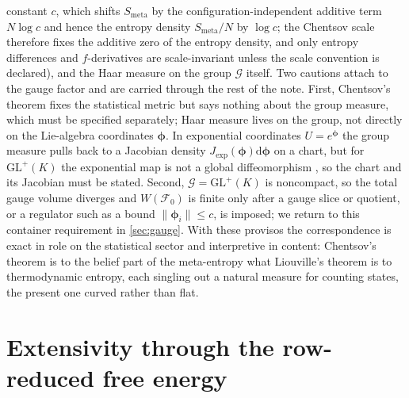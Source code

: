 \documentclass[11pt]{article}
\theoremstyle{plain}
\theoremstyle{definition}
\newcommand{\GL}{\mathrm{GL}}
\newcommand{\dd}{\mathrm{d}}
\newcommand{\bphi}{\boldsymbol{\phi}}
\newcommand{\Fcal}{\mathcal{F}}
\newcommand{\Gcal}{\mathcal{G}}
\newcommand{\Wmeta}{W}
\newcommand{\Smeta}{S_{\mathrm{meta}}}
\begin{document}
constant $c$, which shifts $\Smeta$ by the configuration-independent additive term $N\log c$ and hence
the entropy density $\Smeta/N$ by $\log c$; the Chentsov scale therefore fixes the additive zero of the
entropy density, and only entropy differences and $f$-derivatives are scale-invariant unless the scale
convention is declared), and the
Haar measure on the group $\Gcal$ itself. Two cautions attach to the gauge factor and are
carried through the rest of the note. First, Chentsov's theorem fixes the statistical
metric but says nothing about the group measure, which must be specified separately;
Haar measure lives on the group, not directly on the Lie-algebra coordinates $\bphi$. In
exponential coordinates $U=e^{\bphi}$ the group measure pulls back to a Jacobian density
$J_{\exp}(\bphi)\dd\bphi$ on a chart, but for $\GL^{+}(K)$ the exponential map is not a
global diffeomorphism \citep{higham2008functions}, so the chart and its Jacobian must be
stated. Second, $\Gcal=\GL^{+}(K)$ is noncompact, so the total gauge volume diverges and
$\Wmeta(\Fcal_0)$ is finite only after a gauge slice or quotient, or a regulator such as
a bound $\|\bphi_i\|\le c$, is imposed; we return to this container requirement in
\cref{sec:gauge}. With these provisos the correspondence is exact in role on the
statistical sector and interpretive in content: Chentsov's theorem is to the belief part
of the meta-entropy what Liouville's theorem is to thermodynamic entropy, each singling
out a natural measure for counting states, the present one curved rather than flat.

\section{Extensivity through the row-reduced free energy}
\label{sec:limit}
\end{document}
